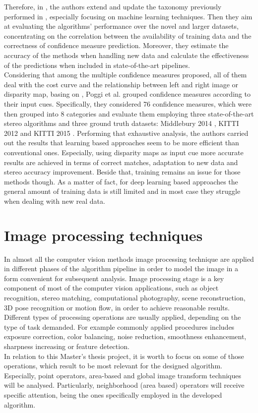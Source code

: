 Therefore, in \cite{Poggi2017}, the authors extend and update the taxonomy previously performed in \cite{Hu2012}, especially focusing on machine learning techniques.
Then they aim at evaluating the algorithms' performance over the novel and larger datasets, concentrating on the correlation between the availability of training data and the correctness of confidence measure prediction. 
Moreover, they estimate the accuracy of the methods when handling new data and calculate the effectiveness of the predictions when included in state-of-the-art pipelines.\\
Considering that among the multiple confidence measures proposed, all of them deal with the cost curve and the relationship between left and right image or disparity map, basing on \cite{Hu2012}, Poggi et al. \cite{Poggi2017} grouped confidence measures according to their input cues. 
Specifically, they considered 76 confidence measures, which were then grouped into 8 categories and evaluate them employing three state-of-the-art stereo algorithms and three ground truth datasets: Middlebury 2014 \cite{Scharstein2014}, KITTI 2012 \cite{geiger2013vision} and KITTI 2015 \cite{menze2015object}.
Performing that exhaustive analysis, the authors carried out the results that learning based approaches seem to be more efficient than conventional ones. 
Especially, using disparity maps as input cue more accurate results are achieved in terms of correct matches, adaptation to new data and stereo accuracy improvement. 
Beside that, training remains an issue for those methods though. 
As a matter of fact, for deep learning based approaches the general amount of training data is still limited and in most case they struggle when dealing with new real data.\\


\section{Image processing techniques}
\label{section:image-proc-technique}

In almost all the computer vision methods image processing technique are applied in different phases of the algorithm pipeline in order to model the image in a form convenient for subsequent analysis. 
Image processing stage is a key component of most of the computer vision applications, such as object recognition, stereo matching, computational photography, scene reconstruction, 3D pose recognition or motion flow, in order to achieve reasonable results. 
Different types of processing operations are usually applied, depending on the type of task demanded.
For example commonly applied procedures includes exposure correction, color balancing, noise reduction, smoothness enhancement, sharpness increasing or feature detection.\\
In relation to this Master's thesis project, it is worth to focus on some of those operations, which result to be most relevant for the designed algorithm. 
Especially, point operators, area-based and global image transform techniques will be analysed. 
Particularly, neighborhood (area based) operators will receive specific attention, being the ones specifically employed in the developed algorithm. \\

